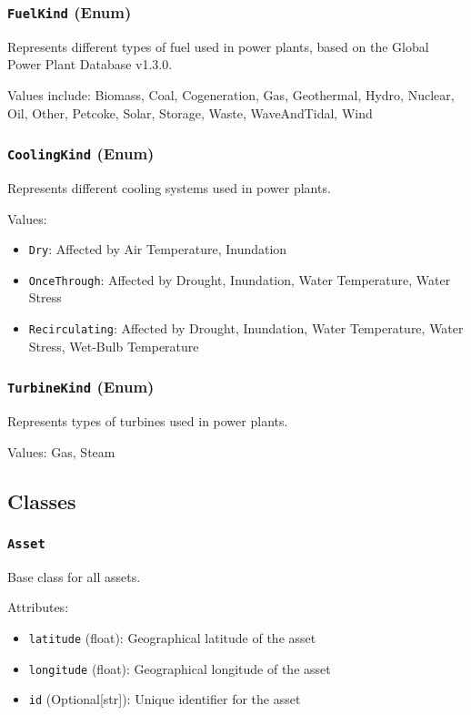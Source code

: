 \documentclass{article}
\begin{document}
\subsubsection{\texttt{FuelKind} (Enum)}
Represents different types of fuel used in power plants, based on the Global Power Plant Database v1.3.0.

Values include: Biomass, Coal, Cogeneration, Gas, Geothermal, Hydro, Nuclear, Oil, Other, Petcoke, Solar, Storage, Waste, WaveAndTidal, Wind

\subsubsection{\texttt{CoolingKind} (Enum)}
Represents different cooling systems used in power plants.

Values:
\begin{itemize}
    \item \texttt{Dry}: Affected by Air Temperature, Inundation
    \item \texttt{OnceThrough}: Affected by Drought, Inundation, Water Temperature, Water Stress
    \item \texttt{Recirculating}: Affected by Drought, Inundation, Water Temperature, Water Stress, Wet-Bulb Temperature
\end{itemize}

\subsubsection{\texttt{TurbineKind} (Enum)}
Represents types of turbines used in power plants.

Values: Gas, Steam

\subsection{Classes}

\subsubsection{\texttt{Asset}}
Base class for all assets.

Attributes:
\begin{itemize}
    \item \texttt{latitude} (float): Geographical latitude of the asset
    \item \texttt{longitude} (float): Geographical longitude of the asset
    \item \texttt{id} (Optional[str]): Unique identifier for the asset
\end{itemize}
\end{document}
